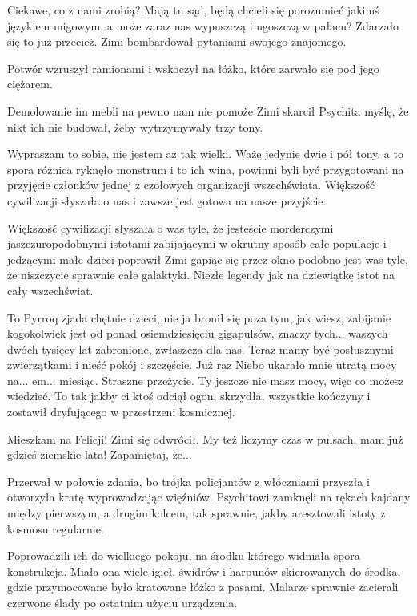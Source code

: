 \ds{} Ciekawe, co z nami zrobią? Mają tu sąd, będą chcieli się porozumieć jakimś językiem migowym, a może zaraz nas wypuszczą i ugoszczą w pałacu? Zdarzało się to już przecież.
\dm{} Zimi bombardował pytaniami swojego znajomego. \de{}

Potwór wzruszył ramionami i wskoczył na łóżko, które zarwało się pod jego ciężarem.

\ds{} Demolowanie im mebli na pewno nam nie pomoże \dm{} Zimi skarcił Psychita \dm{} myślę, że nikt ich nie budował, żeby wytrzymywały trzy tony. \de{}

\ds{} Wypraszam to sobie, nie jestem aż tak wielki. Ważę jedynie dwie i pół tony, a to spora różnica \dm{} ryknęło monstrum \dm{}
i to ich wina, powinni byli być przygotowani na przyjęcie członków jednej z czołowych organizacji wszechświata. Większość cywilizacji słyszała o nas i zawsze jest gotowa na nasze przyjście. \de{}

\ds{} Większość cywilizacji słyszała o was tyle, że jesteście morderczymi jaszczuropodobnymi istotami zabijającymi w okrutny sposób całe populacje i jedzącymi małe dzieci \dm{}
poprawił Zimi gapiąc się przez okno \dm{} podobno jest was tyle, że niszczycie sprawnie całe galaktyki. Niezłe legendy jak na dziewiątkę istot na cały wszechświat. \de{}

\ds{} To Pyrroq zjada chętnie dzieci, nie ja \dm{} bronił się \dm{} poza tym, jak wiesz, zabijanie kogokolwiek jest od ponad osiemdziesięciu gigapulsów, 
znaczy tych... waszych dwóch tysięcy lat zabronione, zwłaszcza dla nas.
Teraz mamy być posłusznymi zwierzątkami i nieść pokój i szczęście. Już raz Niebo ukarało mnie utratą mocy na... em... miesiąc. Straszne przeżycie.
Ty jeszcze nie masz mocy, więc co możesz wiedzieć. To tak jakby ci ktoś odciął ogon, skrzydła, wszystkie kończyny i zostawił dryfującego w przestrzeni kosmicznej. \de{}

\ds{} Mieszkam na Felicji! \dm{} Zimi się odwrócił. \dm{} My też liczymy czas w pulsach, mam już gdzieś ziemskie lata! Zapamiętaj, że... \de{}

Przerwał w połowie zdania, bo trójka policjantów z włóczniami przyszła i otworzyła kratę wyprowadzając więźniów.
Psychitowi zamknęli na rękach kajdany między pierwszym, a drugim kolcem, tak sprawnie, jakby aresztowali istoty z kosmosu regularnie.

Poprowadzili ich do wielkiego pokoju, na środku którego widniała spora konstrukcja.
Miała ona wiele igieł, świdrów i harpunów skierowanych do środka, gdzie przymocowane było kratowane łóżko z pasami.
Malarze sprawnie zacierali czerwone ślady po ostatnim użyciu urządzenia.

